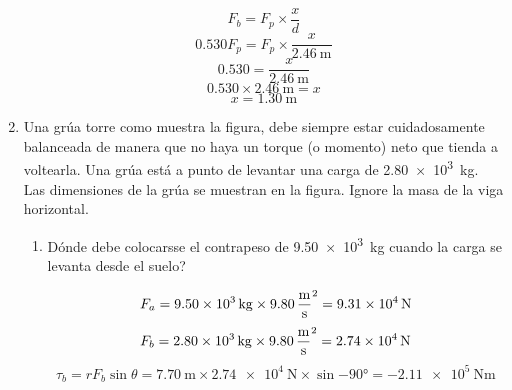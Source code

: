 \documentclass[Análisis.root.tex]{subfiles}
\begin{document}
\begin{enumerate}
\begin{multicols}{2}
\begin{center}
          \end{center}

          \[F_b=F_p\times\frac{x}{d}\]
          \[\num{0,530}F_p=F_p\times\frac{x}{\SI{2,46}{\meter}}\]
          \[\num{0,530}=\frac{x}{\SI{2,46}{\meter}}\]
          \[\num{0,530}\times\SI{2,46}{\meter}=x\]
          \[x=\boxed{\SI{1,30}{\meter}}\]
        \end{multicols}

        \newpage
  \item Una grúa torre como muestra la figura, debe siempre estar cuidadosamente balanceada de manera que no haya un torque (o momento) neto que tienda a voltearla. Una grúa está a punto de levantar una carga de \SI{2,80e3}{\kilogram}. Las dimensiones de la grúa se muestran en la figura. Ignore la masa de la viga horizontal.

        \begin{center}
        \end{center}

        \begin{enumerate}
          \item Dónde debe colocarsse el contrapeso de \SI{9,50e3}{\kilogram} cuando la carga se levanta desde el suelo?

                \[
                  F_a=\SI{9,50e3}{\kilogram}\times\SI{9,80}{\meter\over\second\squared}
                  =\SI{9,31e4}{\newton}
                \]
                \[
                  F_b=\SI{2,80e3}{\kilogram}\times\SI{9,80}{\meter\over\second\squared}
                  =\SI{2,74e4}{\newton}
                \]
                \[
                  \tau_b=rF_b\sin{\theta}
                  =\SI{7,70}{\meter}\times\SI{2,74e4}{\newton}\times\sin{\ang{-90}}
                  =\SI{-2,11e5}{\newton\meter}
                \]


\end{enumerate}
\end{enumerate}
\end{document}
